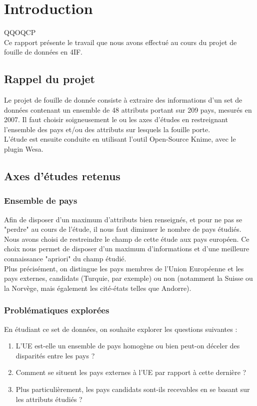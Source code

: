 \section{Introduction}

QQOQCP\\

Ce rapport présente le travail que nous avons effectué au cours du projet
de fouille de données en 4IF.


\subsection{Rappel du projet}

Le projet de fouille de donnée consiste à extraire des informations d'un
set de données contenant un ensemble de 48 attributs portant sur 209 pays,
mesurés en 2007. Il faut choisir soigneusement le ou les axes d'études en
restreignant l'ensemble des pays et/ou des attributs sur lesquels la
fouille porte.\\
L'étude est ensuite conduite en utilisant l'outil Open-Source Knime, avec
le plugin Wesa.


\subsection{Axes d'études retenus}

\subsubsection{Ensemble de pays}
Afin de disposer d'un maximum d'attributs bien renseignés, et pour ne pas
se "perdre" au cours de l'étude, il nous faut diminuer le nombre de pays
étudiés.\\
Nous avons choisi de restreindre le champ de cette étude aux pays européen.
Ce choix nous permet de disposer d'un maximum d'informations et d'une
meilleure connaissance "apriori" du champ étudié.\\
Plus précisément, on distingue les pays membres de l'Union Européenne et
les pays externes, candidats (Turquie, par exemple) ou non (notamment la
Suisse ou la Norvège, mais également les cité-états telles que Andorre).\\

\subsubsection{Problématiques explorées}
En étudiant ce set de données, on souhaite explorer les questions suivantes
:
\begin{enumerate}
\item L'UE est-elle un ensemble de pays homogène ou bien peut-on déceler
des disparités entre les pays ?
\item Comment se situent les pays externes à l'UE par rapport à cette
dernière ?
\item Plus particulièrement, les pays candidats sont-ils recevables en se
basant sur les attributs étudiés ?
\end{enumerate}


